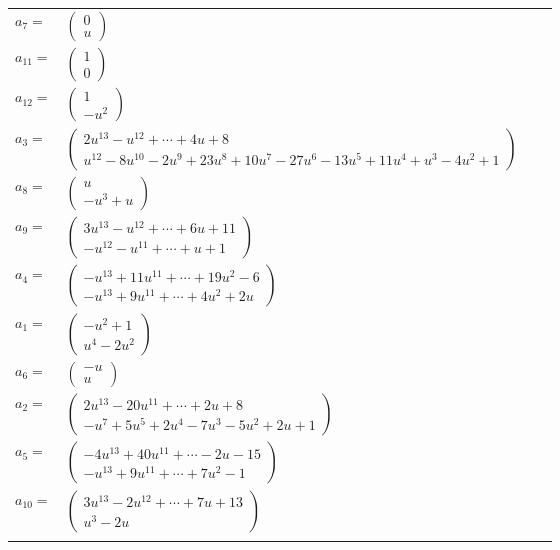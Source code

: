 \documentclass[1p]{elsarticle_modified}
\theoremstyle{definition}
\begin{document}
\begin{tabular}{m{7pt} m{180pt} m{7pt} m{180pt} }
\flushright $a_{7}=$&$\begin{pmatrix}0\\u\end{pmatrix}$ \\
\flushright $a_{11}=$&$\begin{pmatrix}1\\0\end{pmatrix}$ \\
\flushright $a_{12}=$&$\begin{pmatrix}1\\- u^2\end{pmatrix}$ \\
\flushright $a_{3}=$&$\begin{pmatrix}2 u^{13}- u^{12}+\cdots+4 u+8\\u^{12}-8 u^{10}-2 u^9+23 u^8+10 u^7-27 u^6-13 u^5+11 u^4+u^3-4 u^2+1\end{pmatrix}$ \\
\flushright $a_{8}=$&$\begin{pmatrix}u\\- u^3+u\end{pmatrix}$ \\
\flushright $a_{9}=$&$\begin{pmatrix}3 u^{13}- u^{12}+\cdots+6 u+11\\- u^{12}- u^{11}+\cdots+u+1\end{pmatrix}$ \\
\flushright $a_{4}=$&$\begin{pmatrix}- u^{13}+11 u^{11}+\cdots+19 u^2-6\\- u^{13}+9 u^{11}+\cdots+4 u^2+2 u\end{pmatrix}$ \\
\flushright $a_{1}=$&$\begin{pmatrix}- u^2+1\\u^4-2 u^2\end{pmatrix}$ \\
\flushright $a_{6}=$&$\begin{pmatrix}- u\\u\end{pmatrix}$ \\
\flushright $a_{2}=$&$\begin{pmatrix}2 u^{13}-20 u^{11}+\cdots+2 u+8\\- u^7+5 u^5+2 u^4-7 u^3-5 u^2+2 u+1\end{pmatrix}$ \\
\flushright $a_{5}=$&$\begin{pmatrix}-4 u^{13}+40 u^{11}+\cdots-2 u-15\\- u^{13}+9 u^{11}+\cdots+7 u^2-1\end{pmatrix}$ \\
\flushright $a_{10}=$&$\begin{pmatrix}3 u^{13}-2 u^{12}+\cdots+7 u+13\\u^3-2 u\end{pmatrix}$\\&\end{tabular}
\end{document}

